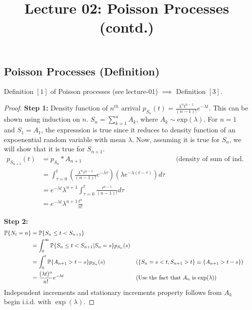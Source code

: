 \documentclass[all-lectures.tex]{subfiles}
\title{Lecture 02: Poisson Processes (contd.)}
\author{}
\begin{document}
\setcounter{chapter}{1}
\setcounter{section}{2}

\section*{}
\setcounter{subsection}{0}
\subsection{Poisson Processes (Definition)}
\begin{prop}[]
Definition $[1]$ of Poisson processes (see lecture-01) $\implies$ Definition $[3]$.
\begin{proof} 
\textbf{Step 1:} Density function of $n^{th}$ arrival $p_{S_n}(t) = \frac{\lambda^n t^{n-1}}{(n-1)!} e^{-\lambda t}$. This can be shown using induction on $n$. $S_n = \sum_{k=1}^n A_k$, where $A_k \sim \mathrm{exp}(\lambda)$. For $n=1$ and $S_1 = A_1$, the expresssion is true since it reduces to density function of an expoenential random variable with mean $\lambda$. Now, assuming it is true for $S_n$, we will show that it is true for $S_{n+1}$.
\begin{align*}
p_{S_{n+1}}(t) &= p_{S_n} * A_{n+1} && \text{(density of sum of ind. r.v.s is their convolution)} \\
&= \int_{\tau = 0}^{t} \left(\frac{\lambda^n \tau^{n-1}}{(n-1)!} e^{-\lambda \tau} \right) \left( \lambda e^{ - \lambda (t-\tau)} \right) d\tau \\
&=  e^{-\lambda t} \lambda^{n+1}  \int_{\tau = 0}^{t} \frac{\tau^{n-1}}{(n-1)!} d\tau \\
&=  e^{-\lambda t} \lambda^{n+1}  \frac{t^n}{n!}
\end{align*}

\textbf{Step 2:} 
\begin{align*}
\P\{N_t = n\} &= \P\{S_n \leq t < S_{n+1} \} \\
 &= \int_0^\infty \P\{S_n \leq t < S_{n+1} |S_n = s\} p_{S_n}(s) \\
 &= \int_0^t \P\{A_{n+1} > t-s\} p_{S_n}(s) &&\text{($\{S_n =  s<t, S_{n+1} > t\} \equiv \{A_{n+1} > t-s\}$)}\\
 &= 	\frac{(\lambda t)^n}{n!} e^{-\lambda t} &&\text{(Use the fact  that $A_n$ is $\mathrm{exp}(\lambda$))} \qedhere
\end{align*}
Independent increments and stationary increments property follows from $A_k$ begin i.i.d. with $\exp(\lambda)$.
\end{proof}
\end{prop}
\end{document}
